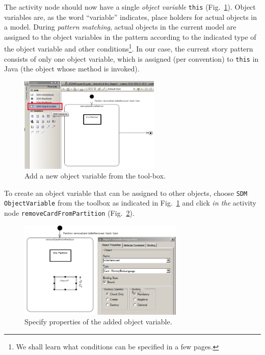 The activity node should now have a single \emph{object variable} \texttt{this}
(Fig.~\ref{fig:tool_box}). Object variables are, as the word ``variable'' indicates,
place holders for actual objects in a model.  During \emph{pattern matching},
actual objects in the  current model are assigned to the object variables in the
pattern according to  the indicated type of the object variable and other
conditions\footnote{We shall learn what conditions can be specified in a
few pages.}. In our case, the current story pattern consists of only
one object variable, which is assigned (per convention) to \texttt{this} in Java (the
object whose method is invoked).

\begin{figure}[htp]
\begin{center}
  \includegraphics[width=0.6\textwidth]{pics/sdmBilder/removeCard/sdm09RAW}
  \caption{Add a new object variable from the tool-box.}  
  \label{fig:tool_box}
\end{center}
\end{figure}

To create an object variable that can be assigned to other objects, choose
\texttt{SDM ObjectVariable} from the toolbox as indicated in
Fig.~\ref{fig:tool_box} and click \emph{in the} activity node \texttt{removeCardFromPartition} (Fig.~\ref{fig:object_variable_properties}). 

\begin{figure}[htp]
\begin{center}
  \includegraphics[width=0.7\textwidth]{pics/sdmBilder/removeCard/sdm10RAW}
  \caption{Specify properties of the added object variable.}  
  \label{fig:object_variable_properties}
\end{center}
\end{figure}

